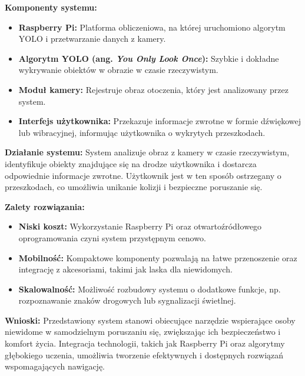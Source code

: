 \documentclass[a4paper,twoside,12pt]{book}
\begin{document}
\textbf{Komponenty systemu:}
\begin{itemize}
    \item \textbf{Raspberry Pi:} Platforma obliczeniowa, na której uruchomiono algorytm YOLO i przetwarzanie danych z kamery.
    \item \textbf{Algorytm YOLO (ang. \textit{You Only Look Once}):} Szybkie i dokładne wykrywanie obiektów w obrazie w czasie rzeczywistym.
    \item \textbf{Moduł kamery:} Rejestruje obraz otoczenia, który jest analizowany przez system.
    \item \textbf{Interfejs użytkownika:} Przekazuje informacje zwrotne w formie dźwiękowej lub wibracyjnej, informując użytkownika o wykrytych przeszkodach.
\end{itemize}

\textbf{Działanie systemu:}
System analizuje obraz z kamery w czasie rzeczywistym, identyfikuje obiekty znajdujące się na drodze użytkownika i dostarcza odpowiednie informacje zwrotne. Użytkownik jest w ten sposób ostrzegany o przeszkodach, co umożliwia unikanie kolizji i bezpieczne poruszanie się.

\textbf{Zalety rozwiązania:}
\begin{itemize}
    \item \textbf{Niski koszt:} Wykorzystanie Raspberry Pi oraz otwartoźródłowego oprogramowania czyni system przystępnym cenowo.
    \item \textbf{Mobilność:} Kompaktowe komponenty pozwalają na łatwe przenoszenie oraz integrację z akcesoriami, takimi jak laska dla niewidomych.
    \item \textbf{Skalowalność:} Możliwość rozbudowy systemu o dodatkowe funkcje, np. rozpoznawanie znaków drogowych lub sygnalizacji świetlnej.
\end{itemize}

\textbf{Wnioski:}
Przedstawiony system stanowi obiecujące narzędzie wspierające osoby niewidome w samodzielnym poruszaniu się, zwiększając ich bezpieczeństwo i komfort życia. Integracja technologii, takich jak Raspberry Pi oraz algorytmy głębokiego uczenia, umożliwia tworzenie efektywnych i dostępnych rozwiązań wspomagających nawigację.



\end{document}
